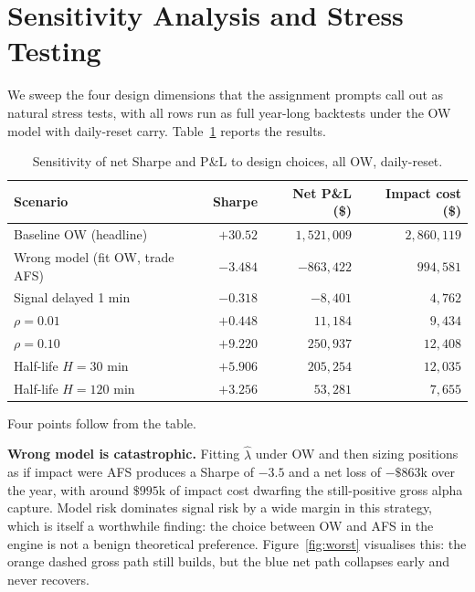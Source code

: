 \documentclass[11pt,a4paper]{article}
\begin{document}
\section{Sensitivity Analysis and Stress Testing}\label{sec:sens}

We sweep the four design dimensions that the assignment prompts call
out as natural stress tests, with all rows run as full year-long
backtests under the OW model with daily-reset carry.
Table~\ref{tab:sens} reports the results.

\begin{table}[H]
\centering\small
\caption{Sensitivity of net Sharpe and P\&L to design choices, all OW,
         daily-reset.}
\label{tab:sens}
\begin{tabular}{lrrr}
\toprule
Scenario & Sharpe & Net P\&L (\$) & Impact cost (\$) \\
\midrule
Baseline OW (headline)              & $+30.52$ & $1{,}521{,}009$  & $2{,}860{,}119$ \\
Wrong model (fit OW, trade AFS)     & $-3.484$ & $-863{,}422$     & $994{,}581$ \\
Signal delayed 1 min                & $-0.318$ & $-8{,}401$       & $4{,}762$ \\
$\rho = 0.01$                       & $+0.448$ & $11{,}184$       & $9{,}434$ \\
$\rho = 0.10$                       & $+9.220$ & $250{,}937$      & $12{,}408$ \\
Half-life $H = 30$ min              & $+5.906$ & $205{,}254$      & $12{,}035$ \\
Half-life $H = 120$ min             & $+3.256$ & $53{,}281$       & $7{,}655$ \\
\bottomrule
\end{tabular}
\end{table}

Four points follow from the table.

\textbf{Wrong model is catastrophic.}  Fitting $\hat\lambda$ under OW
and then sizing positions as if impact were AFS produces a Sharpe of
$-3.5$ and a net loss of $-\$863$k over the year, with around $\$995$k
of impact cost dwarfing the still-positive gross alpha capture.  Model
risk dominates signal risk by a wide margin in this strategy, which is
itself a worthwhile finding: the choice between OW and AFS in the
engine is not a benign theoretical preference.  Figure~\ref{fig:worst}
visualises this: the orange dashed gross path still builds, but the
blue net path collapses early and never recovers.
\end{document}
